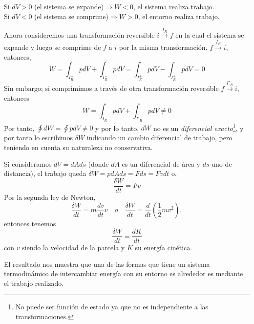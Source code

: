 \documentclass[openany]{book}
\begin{document}
\begin{center}
	Si $dV>0$ (el sistema se expande)$\Rightarrow W<0$, el sistema realiza trabajo.\\
	Si $dV<0$ (el sistema se comprime)$\Rightarrow W>0$, el entorno realiza trabajo.
\end{center}
Ahora consideremos una transformación reversible $ i\xrightarrow{I_R}f $ en la cual el sistema se expande y luego se comprime de $f$ a $i$ por la misma transformación, $ f\xrightarrow{I_R}i $, entonces,
\begin{equation*}
	W=\int_{I_R^+}{pdV}+\int_{I_R^-}{pdV}=\int_{I_R^+}{pdV}-\int_{I_R^+}{pdV}=0
\end{equation*}
Sin embargo; si comprimimos a través de otra transformación reversible $ f\xrightarrow{I'_R}i $, entonces
\begin{equation*}
	W=\int_{I_R}{pdV}+\int_{I'_R}{pdV}\neq0
\end{equation*}
Por tanto, $\oint dW=\oint pdV\neq0$ y por lo tanto, $dW$ no es un \emph{diferencial exacto}\footnote{No puede ser función de estado ya que no es independiente a las transformaciones.}, y por tanto lo escribimos $\delta W$ indicando un cambio diferencial de trabajo, pero teniendo en cuenta su naturaleza no conservativa.\par
Si consideramos $dV=dAds$ (donde $dA$ es un diferencial de área y $ds$ uno de distancia), el trabajo queda $ \delta W=pdAds=Fds=Fvdt $ o,
\begin{equation*}
	\frac{\delta W}{dt}=Fv
\end{equation*}
Por la segunda ley de Newton,
\begin{equation*}
	\frac{\delta W}{dt}=m\frac{dv}{dt}v\quad o \quad \frac{\delta W}{dt}=\frac{d}{dt}\left(\frac{1}{2}mv^2\right),
\end{equation*}
entonces tenemos
\begin{equation}\label{eq:trabajoyenergia}
	\frac{\delta W}{dt}=\frac{dK}{dt}
\end{equation}
con $v$ siendo la velocidad de la parcela y $K$ su energía cinética.\par
El resultado nos muestra que una de las formas que tiene un sistema termodinámico de intercambiar energía con su entorno es alrededor es mediante el trabajo realizado.
\end{document}
